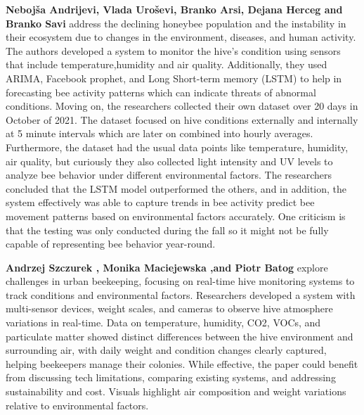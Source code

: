 \documentclass[12pt]{article}
\begin{document}
	
	\noindent \textbf{Nebojša Andrijevi, Vlada Uroševi, Branko Arsi, Dejana Herceg and Branko Savi } \cite{andrijevic2022iot} address the declining honeybee population and the instability in their ecosystem due to changes in the environment, diseases, and human activity. The authors developed a system to monitor the hive's condition using sensors that include temperature,humidity and air quality. Additionally, they used ARIMA, Facebook prophet, and Long Short-term memory (LSTM) to help in forecasting bee activity patterns which can indicate threats of abnormal conditions. Moving on, the researchers collected their own dataset over 20 days in October of 2021. The dataset focused on hive conditions externally and internally at 5 minute intervals which are later on combined into hourly averages. Furthermore, the dataset had the usual data points like temperature, humidity, air quality, but curiously they also collected light intensity and UV levels to analyze bee behavior under different environmental factors. The researchers concluded that the LSTM model outperformed the others, and in addition, the system effectively was able to capture trends in bee activity predict bee movement patterns based on environmental factors accurately. One criticism is that the testing was only conducted during the fall so it might not be fully capable of representing bee behavior year-round. \\ \newline 
	
	
	\noindent \textbf{Andrzej Szczurek , Monika Maciejewska ,and Piotr Batog} \cite{szczurek2023monitoring}
	explore challenges in urban beekeeping, focusing on real-time hive monitoring systems to track conditions and environmental factors. Researchers developed a system with multi-sensor devices, weight scales, and cameras to observe hive atmosphere variations in real-time. Data on temperature, humidity, CO2, VOCs, and particulate matter showed distinct differences between the hive environment and surrounding air, with daily weight and condition changes clearly captured, helping beekeepers manage their colonies. While effective, the paper could benefit from discussing tech limitations, comparing existing systems, and addressing sustainability and cost. Visuals highlight air composition and weight variations relative to environmental factors. \\
	
\end{document}
